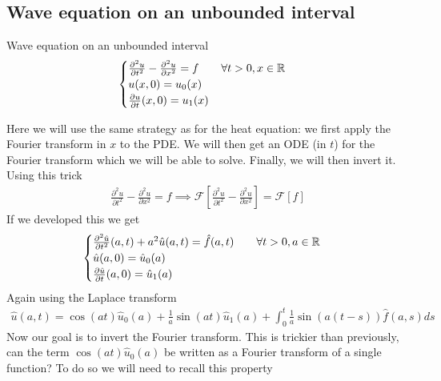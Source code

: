 \subsection{Wave equation on an unbounded interval}
\begin{definition}{Wave equation on an unbounded interval}
\begin{align*} 
	\begin{cases}
		\frac{\partial^2u}{\partial t^2} - \frac{\partial^2u}{\partial x^2} = f \mathspace \mathspace \forall t > 0, x \in \mathbb{R}\\
		u\left(x, 0\right) = u_0\left(x\right)\\
		\frac{\partial u}{\partial t} \left(x, 0\right)= u_1\left(x\right)
	\end{cases} 
\end{align*}
\end{definition}
Here we will use the same strategy as for the heat equation: we first apply the Fourier transform in $x$ to the PDE. We will then get an ODE (in $t$) for the Fourier transform which we will be able to solve. Finally, we will then invert it. Using this trick 
\begin{align*} 
	\frac{\partial^2 u}{\partial t^2}  - \frac{\partial^2 u}{\partial x^2}  = f \implies \mathcal{F}\left[\frac{\partial^2 u}{\partial t^2}  - \frac{\partial^2 u}{\partial x^2}\right] = \mathcal{F}\left[f\right]
\end{align*}
If we developed this we get 
\begin{align*} 
	\begin{cases}
		\frac{\partial^2 \hat{u}}{\partial t^2} \left(a, t\right) + a^2 \hat{u}\left(a, t\right) = \hat{f}\left(a, t\right) \mathspace \mathspace \forall t > 0, a \in \mathbb{R}\\
		\hat{u}\left(a, 0\right) = \hat{u}_0\left(a\right)\\
		\frac{\partial \hat{u}}{\partial t} \left(a, 0\right)= \hat{u}_1\left(a\right)
	\end{cases} 
\end{align*}
Again using the Laplace transform 
\begin{align*} 
	\hat{u}\left(a, t\right) = \cos\left(at\right)\hat{u}_0\left(a\right) + \frac{1}{a}\sin\left(at\right)\hat{u}_1\left(a\right) + \int_0^{t}\frac{1}{a}\sin\left(a\left(t-s\right)\right)\hat{f}\left(a, s\right)ds
\end{align*}
Now our goal is to invert the Fourier transform. This is trickier than previously, can the term $\cos\left(at\right)\hat{u}_0\left(a\right)$ be written as a Fourier transform of a single function? To do so we will need to recall this property 
